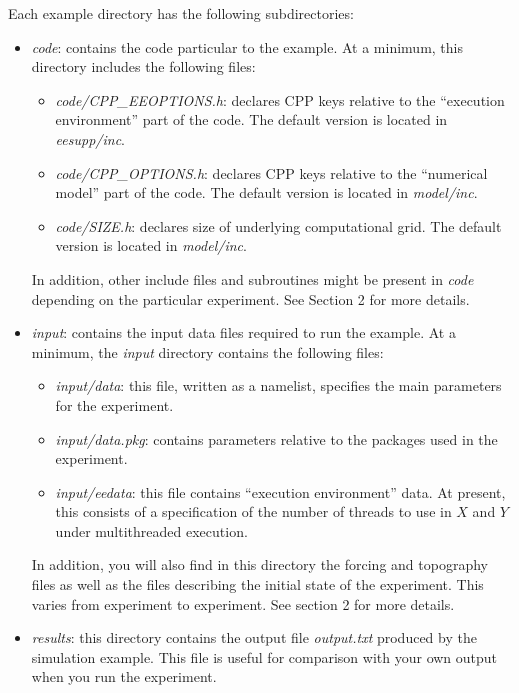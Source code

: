 Each example directory has the following subdirectories:

\begin{itemize}
\item \textit{code}: contains the code particular to the example. At a
  minimum, this directory includes the following files:

  \begin{itemize}
  \item \textit{code/CPP\_EEOPTIONS.h}: declares CPP keys relative to
    the ``execution environment'' part of the code. The default
    version is located in \textit{eesupp/inc}.
  
  \item \textit{code/CPP\_OPTIONS.h}: declares CPP keys relative to
    the ``numerical model'' part of the code. The default version is
    located in \textit{model/inc}.
  
  \item \textit{code/SIZE.h}: declares size of underlying
    computational grid.  The default version is located in
    \textit{model/inc}.
  \end{itemize}
  
  In addition, other include files and subroutines might be present in
  \textit{code} depending on the particular experiment. See Section 2
  for more details.
  
\item \textit{input}: contains the input data files required to run
  the example. At a minimum, the \textit{input} directory contains the
  following files:

  \begin{itemize}
  \item \textit{input/data}: this file, written as a namelist,
    specifies the main parameters for the experiment.
  
  \item \textit{input/data.pkg}: contains parameters relative to the
    packages used in the experiment.
  
  \item \textit{input/eedata}: this file contains ``execution
    environment'' data. At present, this consists of a specification
    of the number of threads to use in $X$ and $Y$ under multithreaded
    execution.
  \end{itemize}
  
  In addition, you will also find in this directory the forcing and
  topography files as well as the files describing the initial state
  of the experiment.  This varies from experiment to experiment. See
  section 2 for more details.

\item \textit{results}: this directory contains the output file
  \textit{output.txt} produced by the simulation example. This file is
  useful for comparison with your own output when you run the
  experiment.
\end{itemize}

